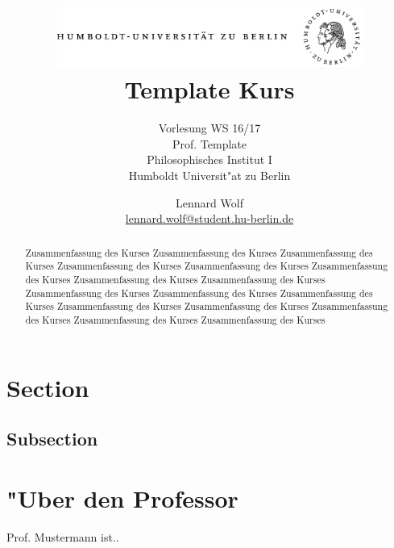 \documentclass[]{scrartcl}
\begin{document}
\title{
	\includegraphics*[width=0.75\textwidth]{images/hu_logo.png}\\
	\vspace{24pt}
	Template Kurs}
\subtitle{Vorlesung WS 16/17\\
          Prof. Template\\
          Philosophisches Institut I \\ 
          Humboldt Universit"at zu Berlin}
\author{Lennard Wolf\\
        \href{mailto:lennard.wolf@student.hu-berlin.de}{lennard.wolf@student.hu-berlin.de}}
\maketitle
\begin{abstract}

Zusammenfassung des Kurses Zusammenfassung des Kurses Zusammenfassung des Kurses Zusammenfassung des Kurses Zusammenfassung des Kurses Zusammenfassung des Kurses Zusammenfassung des Kurses Zusammenfassung des Kurses Zusammenfassung des Kurses Zusammenfassung des Kurses Zusammenfassung des Kurses Zusammenfassung des Kurses Zusammenfassung des Kurses Zusammenfassung des Kurses Zusammenfassung des Kurses Zusammenfassung des Kurses 

\end{abstract}
\newpage

\tableofcontents

\listoffigures
\newpage


\section{Section}



\subsection{Subsection}




\newpage
\section{"Uber den Professor}
Prof. Mustermann ist..
\end{document}
